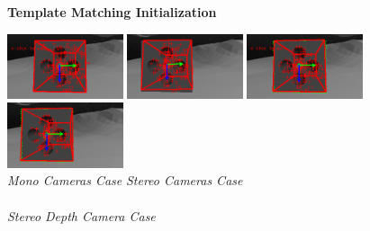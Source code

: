 \vspace{-12px}
\begin{figure}[H]
	\begin{center}
		\textbf{Template Matching Initialization}
	\end{center}
	\vspace{-10px}
	\includegraphics[width=3.4cm]{tracking/templ/mono_left.png}
	\includegraphics[width=3.4cm]{tracking/templ/mono_right.png}
	\hspace{10px}
	\includegraphics[width=3.4cm]{tracking/templ/stereo_left.png}
	\includegraphics[width=3.4cm]{tracking/templ/stereo_right.png}\\
	{\footnotesize \hspace*{20px}\textit{Mono Cameras Case} \hspace{120px} \textit{Stereo Cameras Case}}\\
	\\
    {\footnotesize \textit{Stereo Depth Camera Case}}\\
\end{figure}
